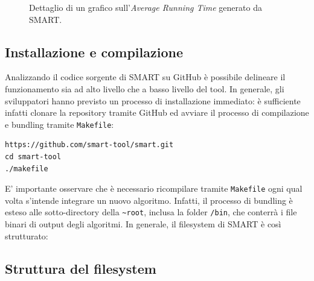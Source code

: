 \begin{figure}[ht!]
    \centering
    \caption{Dettaglio di un grafico sull'\textit{Average Running Time} generato da SMART.}
    \label{fig:esempio}
\end{figure}

\subsection{Installazione e compilazione}

Analizzando il codice sorgente di SMART su GitHub \cite{smartGithub} è possibile delineare il funzionamento sia ad alto livello che a basso livello del tool. In generale, gli sviluppatori hanno previsto un processo di installazione immediato: è sufficiente infatti clonare la repository tramite GitHub ed avviare il processo di compilazione e bundling tramite \verb|Makefile|: 

\begin{verbatim}
https://github.com/smart-tool/smart.git
cd smart-tool
./makefile
\end{verbatim}

E' importante osservare che è necessario ricompilare tramite \verb|Makefile| ogni qual volta s'intende integrare un nuovo algoritmo. Infatti, il processo di bundling è esteso alle sotto-directory della \verb|~root|, inclusa la folder \verb|/bin|, che conterrà i file binari di output degli algoritmi. In generale, il filesystem di SMART è così strutturato:

\subsection{Struttura del filesystem}

